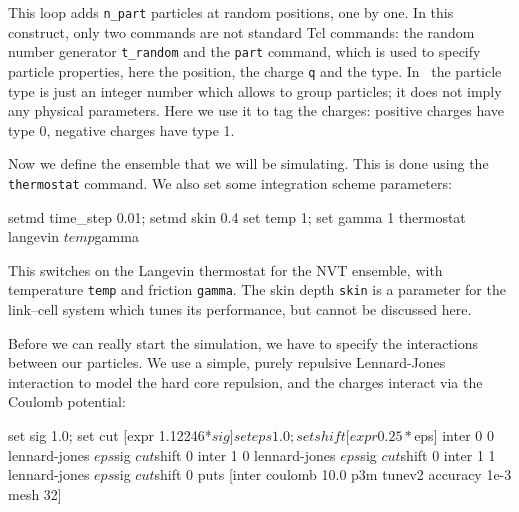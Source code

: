 \documentclass[
a4paper,                        %
11pt,                           %
twoside,                        %
footsepline,                    %
headsepline,                    %
headexclude,                    %
footexclude,                    %
pagesize,                       %
]{scrartcl}
\begin{document}

This loop adds \verb|n_part| particles at random positions, one by
one.  In this construct, only two commands are not standard Tcl
commands: the random number generator \verb|t_random| and the
\verb|part| command, which is used to specify particle properties,
here the position, the charge \verb|q| and the type. In \es\ the
particle type is just an integer number which allows to group
particles; it does not imply any physical parameters. Here we use it
to tag the charges: positive charges have type 0, negative charges
have type 1.

Now we define the ensemble that we will be simulating. This is done
using the \verb|thermostat| command. We also set some integration
scheme parameters:

\begin{tclcode}
  setmd time_step 0.01; setmd skin 0.4
  set temp 1; set gamma 1
  thermostat langevin $temp $gamma
\end{tclcode}

This switches on the Langevin thermostat for the NVT ensemble, with
temperature \verb|temp| and friction \verb|gamma|. The skin depth
\verb|skin| is a parameter for the link--cell system which tunes its
performance, but cannot be discussed here.

Before we can really start the simulation, we have to specify the
interactions between our particles.  We use a simple, purely repulsive
Lennard-Jones interaction to model the hard core repulsion, and the
charges interact via the Coulomb potential:

\begin{tclcode}
  set sig 1.0; set cut [expr 1.12246*$sig]
  set eps 1.0; set shift [expr 0.25*$eps]
  inter 0 0 lennard-jones $eps $sig $cut $shift 0
  inter 1 0 lennard-jones $eps $sig $cut $shift 0
  inter 1 1 lennard-jones $eps $sig $cut $shift 0
  puts [inter coulomb 10.0 p3m tunev2 accuracy 1e-3 mesh 32]
\end{tclcode}
\end{document}
